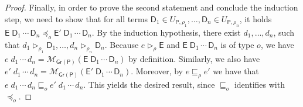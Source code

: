 \documentclass[submission,copyright]{eptcs}
\theoremstyle{definition}
\newcommand{\aleq}[1][]{\sqsubseteq_{#1}}
\newcommand{\ee}[1][I]{\rhd_{#1}}
\newcommand{\bezem}{\mathcal{M}_\mathsf{Gr(P)}}
\begin{document}
\begin{proof}
Finally, in order to prove the second statement and conclude the induction step, we need to show that for all terms $\mathsf{D}_1 \in U_{\mathsf{P},\rho_1}, \ldots, \mathsf{D}_n \in U_{\mathsf{P},\rho_n}$,
it holds $\mathsf{E} \; \mathsf{D}_1 \, \cdots \, \mathsf{D}_n \preceq_o \mathsf{E}' \; \mathsf{D}_1 \, \cdots \, \mathsf{D}_n$. By the induction hypothesis, there exist $d_1, \ldots, d_n$, such that $d_1 \ee[\rho_1] \mathsf{D}_1, \ldots, d_n \ee[\rho_n] \mathsf{D}_n$.
Because $e \ee[\rho] \mathsf{E}$ and $\mathsf{E} \; \mathsf{D}_1 \, \cdots \, \mathsf{D}_n$ is of type $o$, we
have $e \; d_1 \, \cdots \, d_n = \bezem(\mathsf{E} \; \mathsf{D}_1 \, \cdots \, \mathsf{D}_n)$ by definition.
Similarly, we also have $e' \; d_1 \, \cdots \, d_n = \bezem(\mathsf{E}' \; \mathsf{D}_1 \, \cdots \, \mathsf{D}_n)$. Moreover,
by $e \aleq[\rho] e'$ we have that
$e \; d_1 \, \cdots \, d_n \aleq[o] e' \; d_1 \, \cdots \, d_n$. This yields the desired result, since $\aleq[o]$ identifies with $\preceq_o$.
\end{proof}
\end{document}
